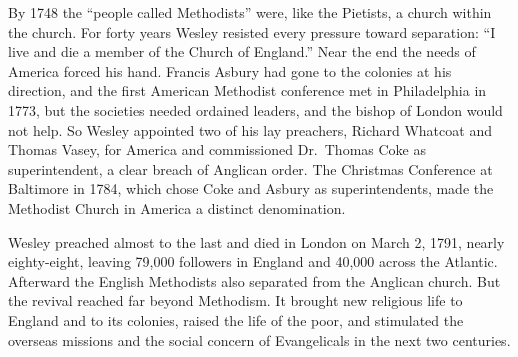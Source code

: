 By 1748 the ``people called Methodists'' were, like the Pietists, a church within the church. For
forty years Wesley resisted every pressure toward separation: ``I live and die a member of the Church
of England.'' Near the end the needs of America forced his hand. Francis Asbury had gone to the colonies at his direction, and the first American Methodist conference met in Philadelphia in 1773, but the societies
needed ordained leaders, and the bishop of London would not help. So Wesley appointed two of his lay
preachers, Richard Whatcoat and Thomas Vasey, for America and commissioned Dr.~Thomas Coke as
superintendent, a clear breach of Anglican order. The Christmas Conference at Baltimore in 1784,
which chose Coke and Asbury as superintendents, made the Methodist Church in America a distinct
denomination.

Wesley preached almost to the last and died in London on March 2, 1791, nearly eighty-eight, leaving
79,000 followers in England and 40,000 across the Atlantic. Afterward the English
Methodists also separated from the Anglican church. But the revival reached far beyond Methodism. It brought new religious life to England and to its colonies, raised the life of the poor, and stimulated
the overseas missions and the social concern of Evangelicals in the next two centuries.

\begin{keyfacts}
\end{keyfacts}
